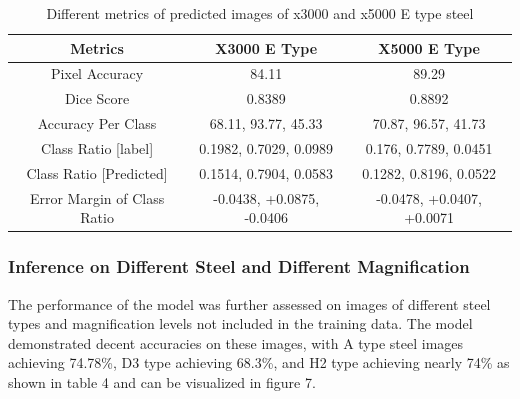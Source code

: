 \documentclass[]{article}
\begin{document}
\begin{table}[h!]
	\centering
	\begin{tabular}{|c|c|c|}
		\hline
		\textbf{Metrics} & \textbf{X3000 E Type} & \textbf{X5000 E Type}\\
		\hline
		Pixel Accuracy & 84.11 & 89.29 \\
		\hline
		Dice Score & 0.8389 & 0.8892 \\
		\hline
		Accuracy Per Class & 68.11, 93.77, 45.33 & 70.87, 96.57, 41.73 \\
		\hline
		Class Ratio [label] & 0.1982, 0.7029, 0.0989 & 0.176, 0.7789, 0.0451 \\
		\hline
		Class Ratio [Predicted] & 0.1514, 0.7904, 0.0583 & 0.1282, 0.8196, 0.0522 \\
		\hline
		Error Margin of Class Ratio & -0.0438, +0.0875, -0.0406 & -0.0478, +0.0407, +0.0071 \\
		\hline
	\end{tabular}
	\caption{Different metrics of predicted images of x3000 and x5000 E type steel}
\end{table}

\subsubsection{Inference on Different Steel and Different Magnification}

The performance of the model was further assessed on images of different steel types and magnification levels not included in the training data. The model demonstrated decent accuracies on these images, with A type steel images achieving 74.78\%, D3 type achieving 68.3\%, and H2 type achieving nearly 74\% as shown in table 4 and can be visualized in figure 7. 
\end{document}
